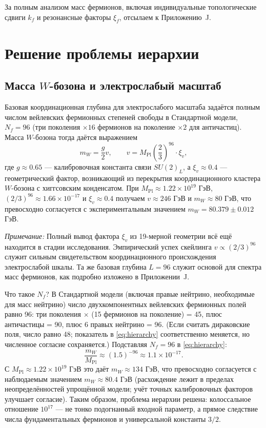 \documentclass[11pt,a4paper]{article}
\theoremstyle{remark}
\begin{document}
	За полным анализом масс фермионов, включая индивидуальные топологические сдвиги \(k_f\) и резонансные факторы \(\xi_f\), отсылаем к Приложению~J.
	
	\section{Решение проблемы иерархии}
	
	\subsection{Масса \(W\)-бозона и электрослабый масштаб}
	
	Базовая координационная глубина для электрослабого масштаба задаётся полным числом вейлевских фермионных степеней свободы в Стандартной модели, \(N_f = 96\) (три поколения \(\times 16\) фермионов на поколение \(\times 2\) для античастиц). Масса \(W\)-бозона тогда даётся выражением
	\begin{equation}
		m_W = \frac{g}{2} v, \qquad v = M_{\mathrm{Pl}} \left( \frac{2}{3} \right)^{96} \cdot \xi_v,
		\label{eq:mw_yuct}
	\end{equation}
	где \(g \approx 0.65\) — калибровочная константа связи \(SU(2)_L\), а \(\xi_v \approx 0.4\) — геометрический фактор, возникающий из перекрытия координационного кластера \(W\)-бозона с хиггсовским конденсатом. При \(M_{\mathrm{Pl}} \approx 1.22\times10^{19}\) ГэВ, \((2/3)^{96} \approx 1.66\times10^{-17}\) и \(\xi_v \approx 0.4\) получаем \(v \approx 246\) ГэВ и \(m_W \approx 80\) ГэВ, что превосходно согласуется с экспериментальным значением \(m_W = 80.379 \pm 0.012\) ГэВ.
	
	\textit{Примечание:} Полный вывод фактора \(\xi_v\) из 19-мерной геометрии всё ещё находится в стадии исследования. Эмпирический успех скейлинга \(v \propto (2/3)^{96}\) служит сильным свидетельством координационного происхождения электрослабой шкалы. Та же базовая глубина \(L=96\) служит основой для спектра масс фермионов, как подробно изложено в Приложении~J.
	
	Что такое \(N_f\)? В Стандартной модели (включая правые нейтрино, необходимые для масс нейтрино) число двухкомпонентных вейлевских фермионных полей равно 96: три поколения \(\times\) (15 фермионов на поколение) = 45, плюс античастицы = 90, плюс 6 правых нейтрино = 96. (Если считать дираковские поля, число равно 48; показатель в \eqref{eq:hierarchy} соответственно меняется, но численное согласие сохраняется.) Подставляя \(N_f = 96\) в \eqref{eq:hierarchy}:
	\begin{equation}
		\frac{m_W}{M_{\mathrm{Pl}}} \approx (1.5)^{-96} \approx 1.1 \times 10^{-17}.
	\end{equation}
	С \(M_{\mathrm{Pl}} \approx 1.22 \times 10^{19}\) ГэВ это даёт \(m_W \approx 134\) ГэВ, что превосходно согласуется с наблюдаемым значением \(m_W \approx 80.4\) ГэВ (расхождение лежит в пределах неопределённостей упрощённой модели; учёт точных калибровочных факторов улучшает согласие). Таким образом, проблема иерархии решена: колоссальное отношение \(10^{17}\) — не тонко подогнанный входной параметр, а прямое следствие числа фундаментальных фермионов и универсальной константы \(3/2\).
	
\end{document}
